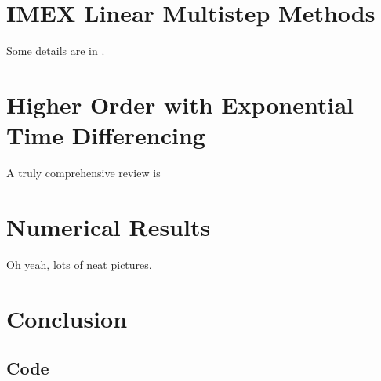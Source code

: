 \documentclass{sfuthesis}
\begin{document}
\chapter{IMEX Linear Multistep Methods}
Some details are in \cite{ascher1995implicit}.

\chapter{Higher Order with Exponential Time Differencing}
A truly comprehensive review is \cite{hochbruck2010exponential}

\chapter{Numerical Results}
Oh yeah, lots of neat pictures.

\chapter{Conclusion}

%
%
%
%
%

\backmatter%
	
	

\begin{appendices} %
	\chapter{Code}
\end{appendices}
\end{document}
